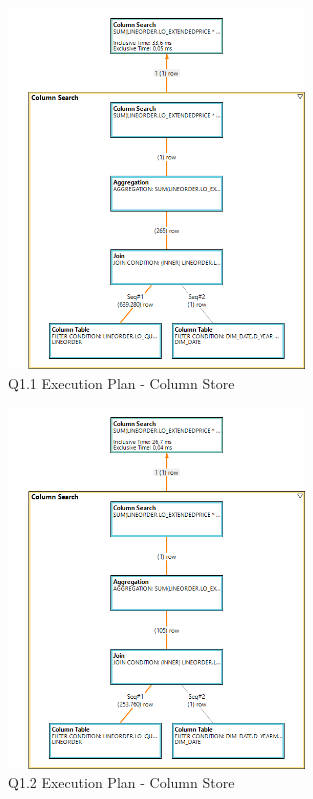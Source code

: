 \begin{figure}[H]
	\centering
	\includegraphics[width=0.7\textwidth]{images/q1-1-col-exec.png}
	\caption{Q1.1 Execution Plan - Column Store}\label{exec:q1.1-col}
\end{figure}
\begin{figure}[H]
	\centering
	\includegraphics[width=0.7\textwidth]{images/q1-2-col-exec.png}
	\caption{Q1.2 Execution Plan - Column Store}\label{exec:q1.2-col}
\end{figure}
